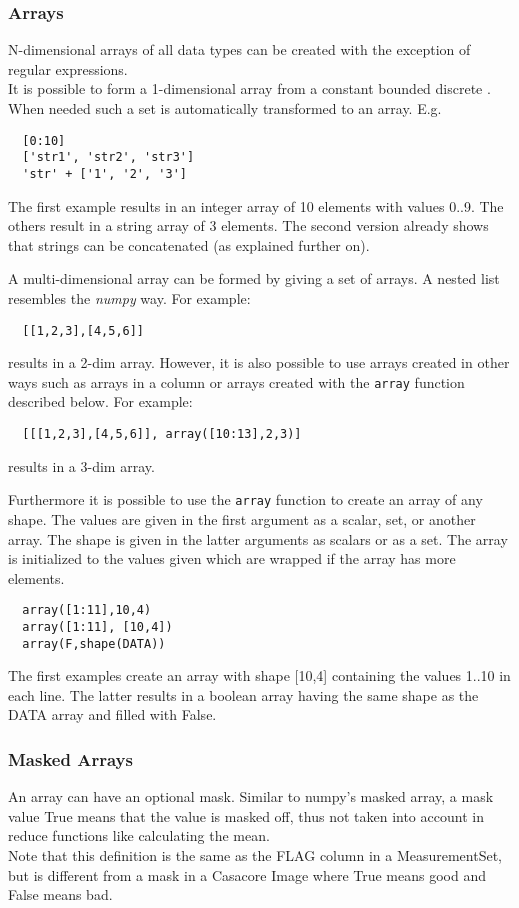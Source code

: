 \subsubsection{Arrays}
N-dimensional arrays of all data types can be created with the
exception of regular expressions. 
\\It is possible to form a 1-dimensional array from a constant bounded discrete
. When needed such a set is automatically
transformed to an array. E.g.
\begin{verbatim}
  [0:10]
  ['str1', 'str2', 'str3']
  'str' + ['1', '2', '3']
\end{verbatim}
The first example results in an integer array of 10 elements with values 0..9.
The others result in a string array of 3 elements. The second version already
shows that strings can be concatenated (as explained further on).

A multi-dimensional array can be formed by giving a set of arrays.
A nested list resembles the {\em numpy} way. For example:
\begin{verbatim}
  [[1,2,3],[4,5,6]]
\end{verbatim}
results in a 2-dim array. However, it is also possible to use arrays
created in other ways such as arrays in a column or arrays created
with the \texttt{array} function described below. For example:
\begin{verbatim}
  [[[1,2,3],[4,5,6]], array([10:13],2,3)]
\end{verbatim}
results in a 3-dim array.

Furthermore it is possible to use the \texttt{array} function to
create an array of any shape. The values are given in the first
argument as a scalar, set, or another array. The shape is given in the latter
arguments as scalars or as a set. The array is initialized to the
values given which are wrapped if the array has more elements.
\begin{verbatim}
  array([1:11],10,4)
  array([1:11], [10,4])
  array(F,shape(DATA))
\end{verbatim}
The first examples create an array with shape [10,4] containing the values
1..10 in each line.
The latter results in a boolean array having the same
shape as the DATA array and filled with False.

\subsubsection{Masked Arrays}
An array can have an optional mask. Similar to numpy's masked
array, a mask value True means that the value is masked off, thus not
taken into account in reduce functions like calculating the mean.
\\Note that this definition is the same as the FLAG column in a
MeasurementSet, but is different from a mask in a Casacore Image where
True means good and False means bad.


